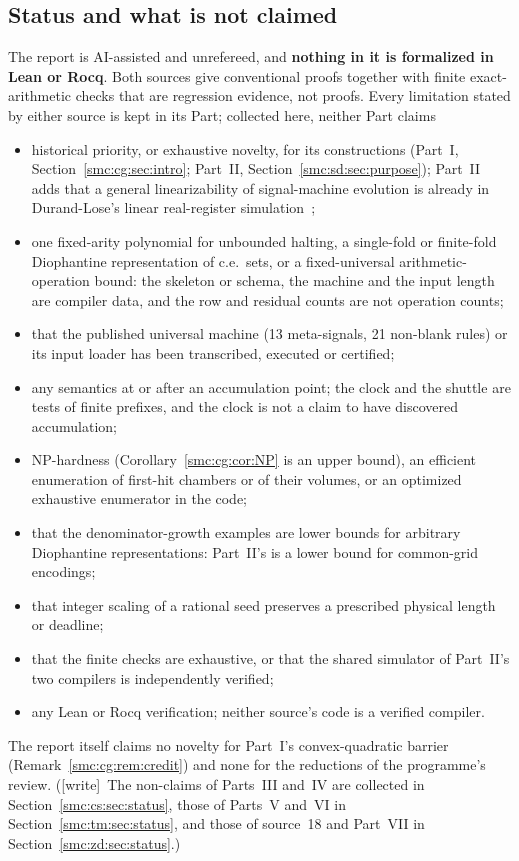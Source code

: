 \documentclass[11pt,letterpaper]{article}
\numberwithin{equation}{section}
\theoremstyle{definition}
\theoremstyle{remark}
\newcommand{\wtag}{\textup{[write]}}
\begin{document}
\subsection{Status and what is not claimed}\label{smc:sec:status}

The report is AI-assisted and unrefereed, and \textbf{nothing in it is formalized in Lean or Rocq}. Both sources give conventional proofs together with finite exact-arithmetic checks that are regression evidence, not proofs. Every limitation stated by either source is kept in its Part; collected here, neither Part claims
\begin{itemize}
\item historical priority, or exhaustive novelty, for its constructions (Part~I, Section~\ref{smc:cg:sec:intro}; Part~II, Section~\ref{smc:sd:sec:purpose}); Part~II adds that a general linearizability of signal-machine evolution is already in Durand-Lose's linear real-register simulation~\cite{DL07};
\item one fixed-arity polynomial for unbounded halting, a single-fold or finite-fold Diophantine representation of c.e.\ sets, or a fixed-universal arithmetic-operation bound: the skeleton or schema, the machine and the input length are compiler data, and the row and residual counts are not operation counts;
\item that the published universal machine (13 meta-signals, 21 non-blank rules) or its input loader has been transcribed, executed or certified;
\item any semantics at or after an accumulation point; the clock and the shuttle are tests of finite prefixes, and the clock is not a claim to have discovered accumulation;
\item NP-hardness (Corollary~\ref{smc:cg:cor:NP} is an upper bound), an efficient enumeration of first-hit chambers or of their volumes, or an optimized exhaustive enumerator in the code;
\item that the denominator-growth examples are lower bounds for arbitrary Diophantine representations: Part~II's is a lower bound for common-grid encodings;
\item that integer scaling of a rational seed preserves a prescribed physical length or deadline;
\item that the finite checks are exhaustive, or that the shared simulator of Part~II's two compilers is independently verified;
\item any Lean or Rocq verification; neither source's code is a verified compiler.
\end{itemize}
The report itself claims no novelty for Part~I's convex-quadratic barrier (Remark~\ref{smc:cg:rem:credit}) and none for the reductions of the programme's review. (\wtag\ The non-claims of Parts~III and~IV are collected in Section~\ref{smc:cs:sec:status}, those of Parts~V and~VI in Section~\ref{smc:tm:sec:status}, and those of source~18 and Part~VII in Section~\ref{smc:zd:sec:status}.)
\end{document}
